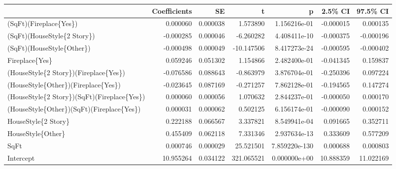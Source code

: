 \begin{tabular}{lrrrrrr}
\toprule
{} &  Coefficients &        SE &           t &              p &    2.5\% CI &   97.5\% CI \\
\midrule
(SqFt)(Fireplace\{Yes\})                      &      0.000060 &  0.000038 &    1.573890 &   1.156216e-01 &  -0.000015 &   0.000135 \\
(SqFt)(HouseStyle\{2 Story\})                 &     -0.000285 &  0.000046 &   -6.260282 &   4.408411e-10 &  -0.000375 &  -0.000196 \\
(SqFt)(HouseStyle\{Other\})                   &     -0.000498 &  0.000049 &  -10.147506 &   8.417273e-24 &  -0.000595 &  -0.000402 \\
Fireplace\{Yes\}                              &      0.059246 &  0.051302 &    1.154866 &   2.482400e-01 &  -0.041345 &   0.159837 \\
(HouseStyle\{2 Story\})(Fireplace\{Yes\})       &     -0.076586 &  0.088643 &   -0.863979 &   3.876704e-01 &  -0.250396 &   0.097224 \\
(HouseStyle\{Other\})(Fireplace\{Yes\})         &     -0.023645 &  0.087169 &   -0.271257 &   7.862128e-01 &  -0.194565 &   0.147274 \\
(HouseStyle\{2 Story\})(SqFt)(Fireplace\{Yes\}) &      0.000060 &  0.000056 &    1.070632 &   2.844237e-01 &  -0.000050 &   0.000170 \\
(HouseStyle\{Other\})(SqFt)(Fireplace\{Yes\})   &      0.000031 &  0.000062 &    0.502125 &   6.156174e-01 &  -0.000090 &   0.000152 \\
HouseStyle\{2 Story\}                         &      0.222188 &  0.066567 &    3.337821 &   8.549941e-04 &   0.091665 &   0.352711 \\
HouseStyle\{Other\}                           &      0.455409 &  0.062118 &    7.331346 &   2.937634e-13 &   0.333609 &   0.577209 \\
SqFt                                        &      0.000746 &  0.000029 &   25.521501 &  7.859220e-130 &   0.000688 &   0.000803 \\
Intercept                                   &     10.955264 &  0.034122 &  321.065521 &   0.000000e+00 &  10.888359 &  11.022169 \\
\bottomrule
\end{tabular}
